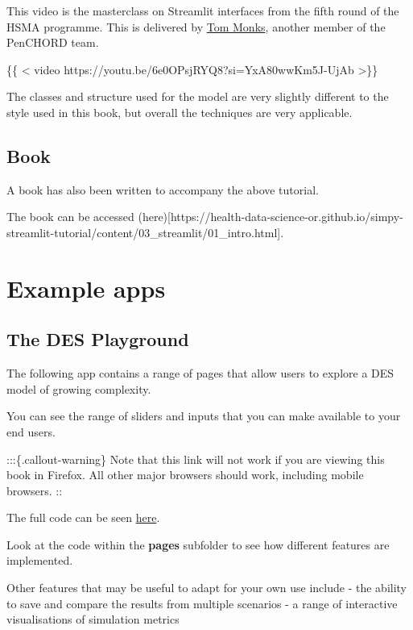 \documentclass[
  letterpaper,
  DIV=11,
  numbers=noendperiod]{scrreprt}
\begin{document}
This video is the masterclass on Streamlit interfaces from the fifth
round of the HSMA programme. This is delivered by
\href{https://orcid.org/0000-0003-2631-4481}{Tom Monks}, another member
of the PenCHORD team.

\{\{ \textless{} video https://youtu.be/6e0OPsjRYQ8?si=YxA80wwKm5J-UjAb
\textgreater\}\}

The classes and structure used for the model are very slightly different
to the style used in this book, but overall the techniques are very
applicable.

\subsection{Book}\label{book}

A book has also been written to accompany the above tutorial.

The book can be accessed
(here){[}https://health-data-science-or.github.io/simpy-streamlit-tutorial/content/03\_streamlit/01\_intro.html{]}.

\section{Example apps}\label{example-apps}

\subsection{The DES Playground}\label{the-des-playground}

The following app contains a range of pages that allow users to explore
a DES model of growing complexity.

You can see the range of sliders and inputs that you can make available
to your end users.

:::\{.callout-warning\} Note that this link will not work if you are
viewing this book in Firefox. All other major browsers should work,
including mobile browsers. ::

The full code can be seen
\href{https://github.com/hsma-programme/Teaching_DES_Concepts_Streamlit}{here}.

Look at the code within the \textbf{pages} subfolder to see how
different features are implemented.

Other features that may be useful to adapt for your own use include -
the ability to save and compare the results from multiple scenarios - a
range of interactive visualisations of simulation metrics
\end{document}

